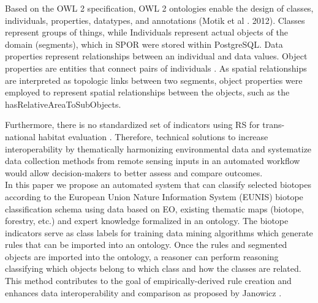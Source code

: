 \documentclass[authoryear, review,12pt,number]{elsarticle}
\begin{document}
 Based on the
OWL 2 specification, OWL 2 ontologies enable the design of classes, individuals,
properties, datatypes, and annotations (Motik et al . 2012).
Classes represent groups of things, while Individuals represent actual objects
of the domain (segments), which in SPOR were stored within PostgreSQL. Data
properties represent relationships between an individual and data values.
Object properties are entities that connect pairs of individuals . As spatial
relationships are interpreted as topologic links between two segments, object
properties were employed to represent spatial relationships between the objects,
such as the hasRelativeAreaToSubObjects.



Furthermore, there is no standardized set of indicators using RS for
trans-national habitat evaluation \citep{Lucas2015}. Therefore, technical
solutions to increase interoperability by thematically harmonizing
environmental data and systematize data collection methods from remote sensing
inputs in an automated workflow would allow decision-makers to better assess and compare outcomes. 
\\
In this paper we propose an automated system that can classify selected
biotopes according to the European Union Nature Information System (EUNIS)
biotope classification schema using data based on EO, existing thematic maps
(biotope, forestry, etc.) and expert knowledge formalized in an ontology.  The
biotope indicators serve as class labels for training data mining algorithms
which generate rules that can be imported into an ontology. Once the rules and
segmented objects are imported into the ontology, a reasoner can perform
reasoning classifying which objects belong to which class and how the classes
are related. This method contributes to the goal of empirically-derived rule
creation and enhances data interoperability and comparison as proposed by
Janowicz \citep{Janowicz2012}.
\end{document}
